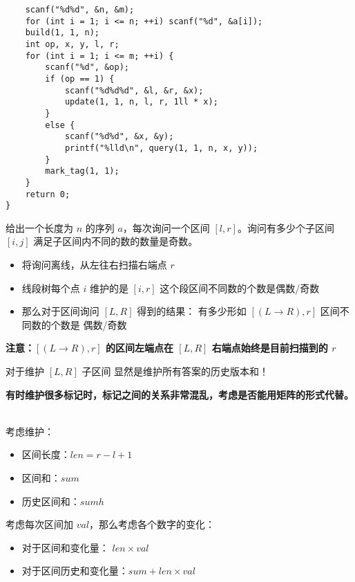 \begin{verbatim}
    scanf("%d%d", &n, &m);
    for (int i = 1; i <= n; ++i) scanf("%d", &a[i]);
    build(1, 1, n);
    int op, x, y, l, r;
    for (int i = 1; i <= m; ++i) {
        scanf("%d", &op);
        if (op == 1) {
            scanf("%d%d%d", &l, &r, &x);
            update(1, 1, n, l, r, 1ll * x);
        }
        else {
            scanf("%d%d", &x, &y);
            printf("%lld\n", query(1, 1, n, x, y));
        }
        mark_tag(1, 1);
    }
    return 0;
}
\end{verbatim}
\begin{tcolorbox}
\par \noindent 给出一个长度为 $n$ 的序列 $a$，每次询问一个区间 $[l,r]$。询问有多少个子区间 $[i,j]$ 满足子区间内不同的数的数量是奇数。
\end{tcolorbox}
\begin{itemize}
\item 将询问离线，从左往右扫描右端点 $r$
\item 线段树每个点 $i$ 维护的是 $[i,r]$ 这个段区间不同数的个数是偶数/奇数
\item 那么对于区间询问 $[L, R]$ 得到的结果： 有多少形如 $[(L\to R), r]$ 区间不同数的个数是 偶数/奇数
\end{itemize}
\textbf{注意：$[(L\to R), r]$ 的区间左端点在 $[L,R]$ 右端点始终是目前扫描到的 $r$ }
~\\
\par \noindent 对于维护 $[L,R]$ 子区间 显然是维护所有答案的历史版本和！
~\\

\par \noindent \textbf{有时维护很多标记时，标记之间的关系非常混乱，考虑是否能用矩阵的形式代替。}
~\\
\par \noindent 考虑维护：

\begin{itemize}
\item 区间长度：$len=r-l+1$
\item 区间和：$sum$
\item 历史区间和：$sumh$
\end{itemize}

\par \noindent 考虑每次区间加 $val$，那么考虑各个数字的变化：

\begin{itemize}
\item 对于区间和变化量： $len×val$
\item 对于区间历史和变化量：$sum+len×val$
\end{itemize}

